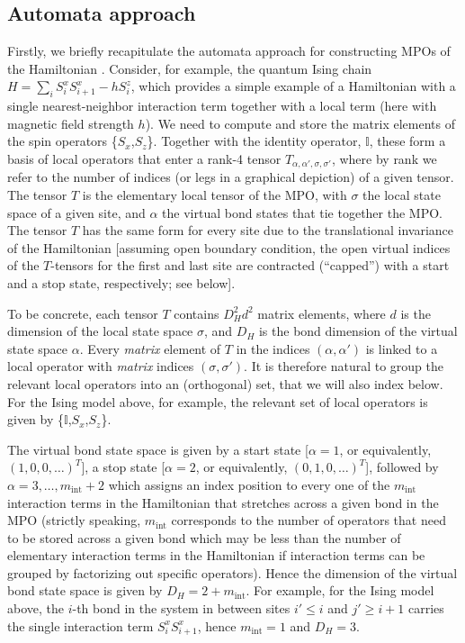 \documentclass[aps,prx,twocolumn,showpacs,psfig,superscriptaddress,longbibliography]{revtex4-1}
\begin{document}
\subsection{Automata approach}
 
Firstly, we briefly recapitulate the automata approach for
constructing MPOs of the Hamiltonian \cite{Frowis.f+:2010:Tensor,
Pirvu.b+:2010:MPO, Crosswhite.g.m+:2008:Automata}.  Consider, for
example, the quantum Ising chain $H=\sum_i S_i^x S_{i+1}^x - h
S_i^z$, which provides a simple example of a Hamiltonian with a
single nearest-neighbor interaction term together with a local term
(here with magnetic field strength $h$).
%
We need to compute and store the matrix elements of the spin
operators \{$S_x$,$S_z$\}.  Together with the identity operator,
$\mathbb{I}$, these form a basis of local operators that enter a
rank-4 tensor $T_{\alpha, \alpha', \sigma, \sigma'}$, where by rank
we refer to the number of indices (or legs in a graphical depiction)
of a given tensor.  The tensor $T$ is the elementary local tensor of
the MPO, with $\sigma$ the local state space of a given site, and
$\alpha$ the virtual bond states that tie together the MPO. The
tensor $T$ has the same form for every site due to the translational
invariance of the Hamiltonian [assuming open boundary condition, the
open virtual indices of the $T$-tensors for the first and last site
are contracted (``capped'') with a start and a stop state,
respectively; see below].

To be concrete, each tensor $T$  contains $D_H^2 d^2$ matrix
elements, where $d$ is the dimension of the local state space
$\sigma$, and $D_H$ is the bond dimension of the virtual state space
$\alpha$.  Every {\it matrix} element of $T$ in the indices
$(\alpha,\alpha')$ is linked to a local operator with {\it matrix}
indices $(\sigma,\sigma')$.  It is therefore natural to group the
relevant local operators into an (orthogonal) set, that we will also
index below.  For the Ising model above, for example, the relevant
set of local operators is given by \{$\mathbb{I}$,$S_x$,$S_z$\}.

The virtual bond state space is given by a start state [$\alpha=1$,
or equivalently, $(1,0,0,\ldots)^T$], a stop state [$\alpha=2$, or
equivalently, $(0,1,0,\ldots)^T$], followed by $\alpha=3, \ldots,
m_\mathrm{int}+2$ which assigns an index position to every one of
the $m_\mathrm{int}$ interaction terms in the Hamiltonian that
stretches across a given bond in the MPO (strictly speaking,
$m_\mathrm{int}$ corresponds to the number of operators that need to
be stored across a given bond which may be less than the number of
elementary interaction terms in the Hamiltonian if interaction terms
can be grouped by factorizing out specific operators). Hence the
dimension of the virtual bond state space is given by $D_H = 2 +
m_\mathrm{int}$.
%
For example, for the Ising model above, the $i$-th bond in the
system in between sites $i' \le i$ and $j'\ge i+1$ carries the
single interaction term $S_i^x S_{i+1}^x$, hence $m_\mathrm{int}=1$
and $D_H=3$.
\end{document}
